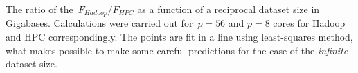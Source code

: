 \documentclass{article}
\begin{document}
\begin{center}

\end{center}
The ratio of the~$F_{Hadoop}/F_{HPC}$ as a function of a reciprocal dataset size in Gigabases.  Calculations were carried out for~$p=56$ and $p=8$ cores for Hadoop and HPC correspondingly.
The points are fit in a line using least-squares method, what makes  possible to make some careful predictions for the case of the {\it infinite} dataset size.
\end{document}
